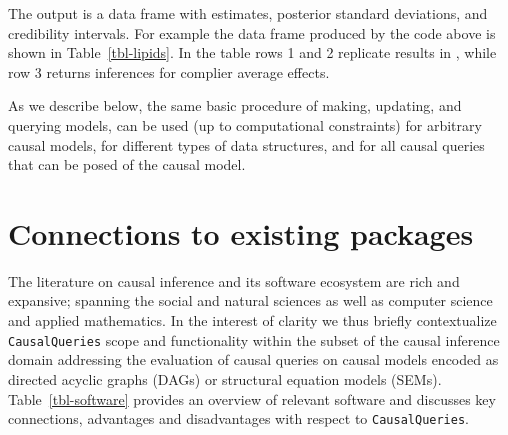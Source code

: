 \documentclass[
  11pt,
  article]{jss}
\begin{document}
\hypertarget{tbl-lipids}{}
\begin{table}
\caption{\label{tbl-lipids}Replication of . }\tabularnewline

\centering
{}
\end{table}

The output is a data frame with estimates, posterior standard
deviations, and credibility intervals. For example the data frame
produced by the code above is shown in Table~\ref{tbl-lipids}. In the
table rows 1 and 2 replicate results in
\citet{chickering_clinicians_1996}, while row 3 returns inferences for
complier average effects.

As we describe below, the same basic procedure of making, updating, and
querying models, can be used (up to computational constraints) for
arbitrary causal models, for different types of data structures, and for
all causal queries that can be posed of the causal model.

\hypertarget{connections-to-existing-packages}{%
\section{Connections to existing
packages}\label{connections-to-existing-packages}}

The literature on causal inference and its software ecosystem are rich
and expansive; spanning the social and natural sciences as well as
computer science and applied mathematics. In the interest of clarity we
thus briefly contextualize \texttt{CausalQueries} scope and
functionality within the subset of the causal inference domain
addressing the evaluation of causal queries on causal models encoded as
directed acyclic graphs (DAGs) or structural equation models (SEMs).
Table~\ref{tbl-software} provides an overview of relevant software and
discusses key connections, advantages and disadvantages with respect to
\texttt{CausalQueries}.
\end{document}
